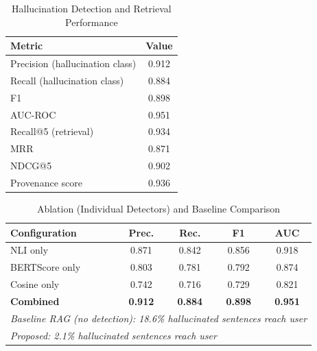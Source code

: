\documentclass[conference]{IEEEtran}
\begin{document}
\begin{table}[!t]
\caption{Hallucination Detection and Retrieval Performance}
\label{tab:main}
\centering
\small
\begin{tabular}{@{}lc@{}}
\toprule
Metric & Value \\
\midrule
Precision (hallucination class) & 0.912 \\
Recall (hallucination class) & 0.884 \\
F1 & 0.898 \\
AUC-ROC & 0.951 \\
Recall@5 (retrieval) & 0.934 \\
MRR & 0.871 \\
NDCG@5 & 0.902 \\
Provenance score & 0.936 \\
\bottomrule
\end{tabular}
\end{table}

\begin{table}[!t]
\caption{Ablation (Individual Detectors) and Baseline Comparison}
\label{tab:ablation}
\centering
\small
\begin{tabular}{@{}lcccc@{}}
\toprule
Configuration & Prec. & Rec. & F1 & AUC \\
\midrule
NLI only & 0.871 & 0.842 & 0.856 & 0.918 \\
BERTScore only & 0.803 & 0.781 & 0.792 & 0.874 \\
Cosine only & 0.742 & 0.716 & 0.729 & 0.821 \\
\textbf{Combined} & \textbf{0.912} & \textbf{0.884} & \textbf{0.898} & \textbf{0.951} \\
\midrule
\multicolumn{5}{l}{\textit{Baseline RAG (no detection): 18.6\% hallucinated sentences reach user}} \\
\multicolumn{5}{l}{\textit{Proposed: 2.1\% hallucinated sentences reach user}} \\
\bottomrule
\end{tabular}
\end{table}
\end{document}
